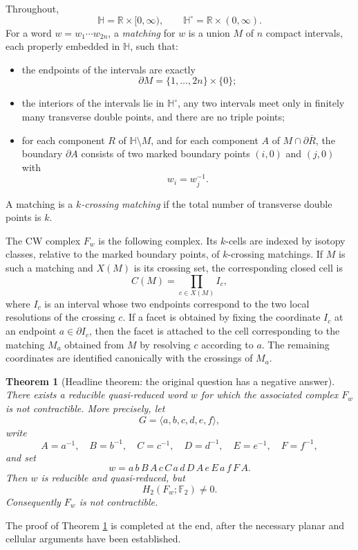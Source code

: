\documentclass[12pt]{article}
\newcommand{\RR}{\mathbb{R}}
\newcommand{\HH}{\mathbb{H}}
\newcommand{\Ftwo}{\mathbb{F}_2}
\newcommand{\bd}{\partial}
\newtheorem{theorem}{Theorem}
\theoremstyle{definition}
\begin{document}
Throughout,
\[
\HH=\RR\times[0,\infty),\qquad \HH^\circ=\RR\times(0,\infty).
\]
For a word \(w=w_1\cdots w_{2n}\), a \emph{matching} for \(w\) is a union \(M\) of \(n\) compact intervals, each properly embedded in \(\HH\), such that:
\begin{itemize}
\item the endpoints of the intervals are exactly
\[
\bd M=\{1,\dots,2n\}\times\{0\};
\]
\item the interiors of the intervals lie in \(\HH^\circ\), any two intervals meet only in finitely many transverse double points, and there are no triple points;
\item for each component \(R\) of \(\HH\setminus M\), and for each component \(A\) of \(M\cap\bd\overline{R}\), the boundary \(\bd A\) consists of two marked boundary points \((i,0)\) and \((j,0)\) with
\[
w_i=w_j^{-1}.
\]
\end{itemize}
A matching is a \emph{\(k\)-crossing matching} if the total number of transverse double points is \(k\).

The CW complex \(F_w\) is the following complex.  Its \(k\)-cells are indexed by isotopy classes, relative to the marked boundary points, of \(k\)-crossing matchings.  If \(M\) is such a matching and \(X(M)\) is its crossing set, the corresponding closed cell is
\[
C(M)=\prod_{c\in X(M)} I_c,
\]
where \(I_c\) is an interval whose two endpoints correspond to the two local resolutions of the crossing \(c\).  If a facet is obtained by fixing the coordinate \(I_c\) at an endpoint \(a\in\bd I_c\), then the facet is attached to the cell corresponding to the matching \(M_a\) obtained from \(M\) by resolving \(c\) according to \(a\).  The remaining coordinates are identified canonically with the crossings of \(M_a\).

\begin{theorem}[Headline theorem: the original question has a negative answer]\label{thm:headline}
There exists a reducible quasi-reduced word \(w\) for which the associated complex \(F_w\) is not contractible.  More precisely, let
\[
G=\langle a,b,c,d,e,f\rangle,
\]
write
\[
A=a^{-1},\quad B=b^{-1},\quad C=c^{-1},\quad
D=d^{-1},\quad E=e^{-1},\quad F=f^{-1},
\]
and set
\[
w=a\,b\,B\,A\,c\,C\,a\,d\,D\,A\,e\,E\,a\,f\,F\,A.
\]
Then \(w\) is reducible and quasi-reduced, but
\[
H_2(F_w;\Ftwo)\neq 0.
\]
Consequently \(F_w\) is not contractible.
\end{theorem}

The proof of Theorem \ref{thm:headline} is completed at the end, after the necessary planar and cellular arguments have been established.
\end{document}
